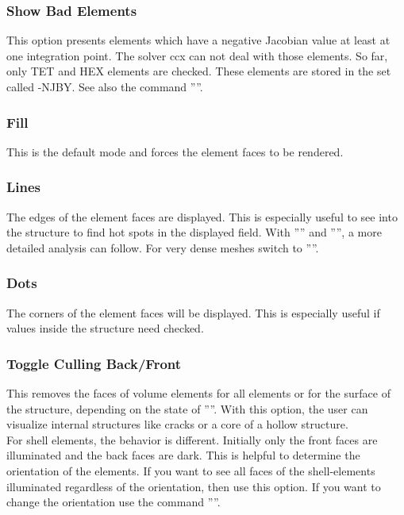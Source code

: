 \documentclass{article}
\begin{document}
\subsubsection{\label{Show Bad Elements}Show Bad Elements}
This option presents elements which have a negative Jacobian value at least at one integration point. The solver ccx can not deal with those elements. So far, only TET and HEX elements are checked. These elements are stored in the set called -NJBY. See also the command ''''.

\subsubsection{\label{Fill}Fill}
This is the default mode and forces the element faces to be rendered.

\subsubsection{\label{Lines}Lines}
The edges of the element faces are displayed. This is especially useful to see into the structure to find hot spots in the displayed field. With '''' and '''', a more detailed analysis can follow. For very dense meshes switch to ''''.

\subsubsection{\label{Dots}Dots}
The corners of the element faces will be displayed. This is especially useful if values inside the structure need checked.

\subsubsection{\label{Toggle Culling Back/Front}Toggle Culling Back/Front}
This removes the faces of volume elements for all elements or for the surface of the structure, depending on the state of ''''. With this option, the user can visualize internal structures like cracks or a core of a hollow structure.\\ 
For shell elements, the behavior is different. Initially only the front faces are illuminated and the back faces are dark. This is helpful to determine the orientation of the elements. If you want to see all faces of the shell-elements illuminated regardless of the orientation, then use this option. If you want to change the orientation use the command ''''.
\end{document}
